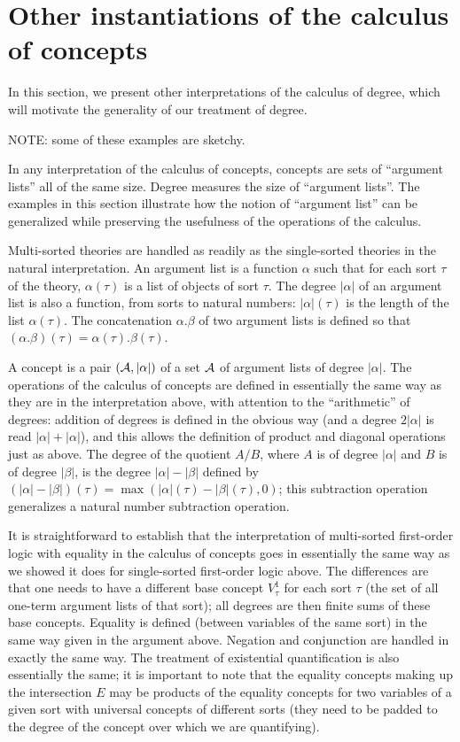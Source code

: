\documentclass{article}
\begin{document}
\section{Other instantiations of the calculus of concepts}

In this section, we present other interpretations of the calculus of
degree, which will motivate the generality of our treatment of degree.

NOTE:  some of these examples are sketchy.

In any interpretation of the calculus of concepts, concepts are sets
of ``argument lists'' all of the same size.  Degree measures the size
of ``argument lists''.  The examples in this section illustrate how
the notion of ``argument list'' can be generalized while preserving
the usefulness of the operations of the calculus.

Multi-sorted theories are handled as readily as the single-sorted
theories in the natural interpretation.  An argument list is a
function $\alpha$ such that for each sort $\tau$ of the theory,
$\alpha(\tau)$ is a list of objects of sort $\tau$.  The degree
$|\alpha|$ of an argument list is also a function, from sorts to
natural numbers: $|\alpha|(\tau)$ is the length of the list
$\alpha(\tau)$.  The concatenation $\alpha.\beta$ of two argument
lists is defined so that $(\alpha.\beta)(\tau) =
\alpha(\tau).\beta(\tau)$.

A concept is a pair $({\cal A},|\alpha|)$ of a set ${\cal A}$ of
argument lists of degree $|\alpha|$.  The operations of the calculus
of concepts are defined in essentially the same way as they are in the
interpretation above, with attention to the ``arithmetic'' of degrees:
addition of degrees is defined in the obvious way (and a degree
$2|\alpha|$ is read $|\alpha|+|\alpha|$), and this allows the
definition of product and diagonal operations just as above.  The
degree of the quotient $A/B$, where $A$ is of degree $|\alpha|$ and
$B$ is of degree $|\beta|$, is the degree $|\alpha|-|\beta|$ defined
by $(|\alpha|-|\beta|)(\tau) = \max(|\alpha|(\tau)-|\beta|(\tau),0)$;
this subtraction operation generalizes a natural number subtraction
operation.

It is straightforward to establish that the interpretation of
multi-sorted first-order logic with equality in the calculus of
concepts goes in essentially the same way as we showed it does for
single-sorted first-order logic above.  The differences are that one
needs to have a different base concept $V^1_{\tau}$ for each sort
$\tau$ (the set of all one-term argument lists of that sort); all
degrees are then finite sums of these base concepts.  Equality is
defined (between variables of the same sort) in the same way given in
the argument above.  Negation and conjunction are handled in exactly
the same way.  The treatment of existential quantification is also
essentially the same; it is important to note that the equality
concepts making up the intersection $E$ may be products of the
equality concepts for two variables of a given sort with universal
concepts of different sorts (they need to be padded to the degree of
the concept over which we are quantifying).
\end{document}
